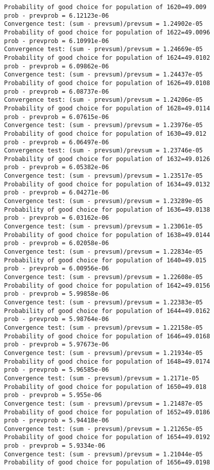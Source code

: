 \documentclass[11pt,onecolumn]{article}
\begin{document}
\begin{verbatim}
Probability of good choice for population of 1620=49.009
prob - prevprob = 6.12123e-06
Convergence test: (sum - prevsum)/prevsum = 1.24902e-05
Probability of good choice for population of 1622=49.0096
prob - prevprob = 6.10991e-06
Convergence test: (sum - prevsum)/prevsum = 1.24669e-05
Probability of good choice for population of 1624=49.0102
prob - prevprob = 6.09862e-06
Convergence test: (sum - prevsum)/prevsum = 1.24437e-05
Probability of good choice for population of 1626=49.0108
prob - prevprob = 6.08737e-06
Convergence test: (sum - prevsum)/prevsum = 1.24206e-05
Probability of good choice for population of 1628=49.0114
prob - prevprob = 6.07615e-06
Convergence test: (sum - prevsum)/prevsum = 1.23976e-05
Probability of good choice for population of 1630=49.012
prob - prevprob = 6.06497e-06
Convergence test: (sum - prevsum)/prevsum = 1.23746e-05
Probability of good choice for population of 1632=49.0126
prob - prevprob = 6.05382e-06
Convergence test: (sum - prevsum)/prevsum = 1.23517e-05
Probability of good choice for population of 1634=49.0132
prob - prevprob = 6.04271e-06
Convergence test: (sum - prevsum)/prevsum = 1.23289e-05
Probability of good choice for population of 1636=49.0138
prob - prevprob = 6.03162e-06
Convergence test: (sum - prevsum)/prevsum = 1.23061e-05
Probability of good choice for population of 1638=49.0144
prob - prevprob = 6.02058e-06
Convergence test: (sum - prevsum)/prevsum = 1.22834e-05
Probability of good choice for population of 1640=49.015
prob - prevprob = 6.00956e-06
Convergence test: (sum - prevsum)/prevsum = 1.22608e-05
Probability of good choice for population of 1642=49.0156
prob - prevprob = 5.99858e-06
Convergence test: (sum - prevsum)/prevsum = 1.22383e-05
Probability of good choice for population of 1644=49.0162
prob - prevprob = 5.98764e-06
Convergence test: (sum - prevsum)/prevsum = 1.22158e-05
Probability of good choice for population of 1646=49.0168
prob - prevprob = 5.97673e-06
Convergence test: (sum - prevsum)/prevsum = 1.21934e-05
Probability of good choice for population of 1648=49.0174
prob - prevprob = 5.96585e-06
Convergence test: (sum - prevsum)/prevsum = 1.2171e-05
Probability of good choice for population of 1650=49.018
prob - prevprob = 5.955e-06
Convergence test: (sum - prevsum)/prevsum = 1.21487e-05
Probability of good choice for population of 1652=49.0186
prob - prevprob = 5.94418e-06
Convergence test: (sum - prevsum)/prevsum = 1.21265e-05
Probability of good choice for population of 1654=49.0192
prob - prevprob = 5.9334e-06
Convergence test: (sum - prevsum)/prevsum = 1.21044e-05
Probability of good choice for population of 1656=49.0198

\end{verbatim}
\end{document}
